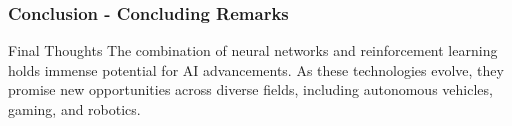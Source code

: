 \documentclass[aspectratio=169]{beamer}
\begin{document}
\begin{frame}[fragile]
    \frametitle{Conclusion - Concluding Remarks}
    \begin{block}{Final Thoughts}
    The combination of neural networks and reinforcement learning holds immense potential for AI advancements. As these technologies evolve, they promise new opportunities across diverse fields, including autonomous vehicles, gaming, and robotics.
    \end{block}
\end{frame}
\end{document}

